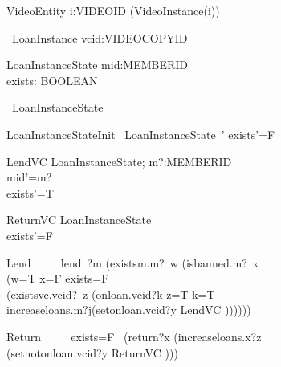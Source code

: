 \documentclass{article}
\begin{document}
\begin{circus}
    \circprocess VideoEntity \circdef i:VIDEOID \circspot (VideoInstance(i))  \\
\end{circus}

\begin{circus}
    \circprocess\ LoanInstance \circdef vcid:VIDEOCOPYID \circspot \circbegin
\end{circus}

\begin{schema}{LoanInstanceState}
	mid:MEMBERID\\
	exists: BOOLEAN\\
\end{schema}

\begin{circusaction}
   \circstate\ LoanInstanceState
\end{circusaction}

\begin{schema}{LoanInstanceStateInit}
    ~LoanInstanceState~'
\where
    exists'=F \\
\end{schema}

\begin{schema}{LendVC}
   \Delta LoanInstanceState; m?:MEMBERID  \\
    \where
	mid'=m?\\
	exists'=T \\
\end{schema}

\begin{schema}{ReturnVC}
   \Delta LoanInstanceState\\
    \where
	exists'=F \\
\end{schema}


\begin{circusaction}
      Lend ~~\circdef~~ lend~?m \then (existsm.m?~w \then (isbanned.m?~x \then\\
      					(\lcircguard w=T \land x=F  \land exists=F \rcircguard  \circguard \\
						(existsvc.vcid?~z \then(onloan.vcid?k \then \lcircguard z=T \land k=T \rcircguard \circguard \\
										 increaseloans.m?j\then(setonloan.vcid?y\then
										 \lschexpract LendVC \rschexpract))))))\\
\end{circusaction}
			
\begin{circusaction}
     Return ~~\circdef~~ \lcircguard exists=F \rcircguard  \circguard\ (return?x \then (increaseloans.x?z \then\\
     					(setnotonloan.vcid?y \then \lschexpract ReturnVC \rschexpract)))\\
\end{circusaction}
\end{document}
